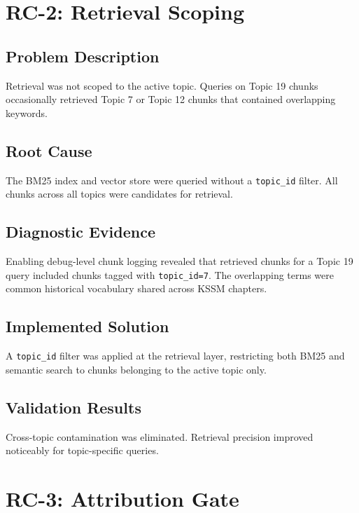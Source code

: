 \documentclass[12pt, a4paper]{report}
\newcommand{\codeinline}[1]{\texttt{#1}}
\begin{document}
\section{RC-2: Retrieval Scoping}
\label{sec:rc2}

\subsection{Problem Description}

Retrieval was not scoped to the active topic. Queries on Topic 19 chunks
occasionally retrieved Topic 7 or Topic 12 chunks that contained overlapping
keywords.

\subsection{Root Cause}

The BM25 index and vector store were queried without a \codeinline{topic\_id}
filter. All chunks across all topics were candidates for retrieval.

\subsection{Diagnostic Evidence}

Enabling debug-level chunk logging revealed that retrieved chunks for a Topic 19
query included chunks tagged with \codeinline{topic\_id=7}. The overlapping
terms were common historical vocabulary shared across KSSM chapters.

\subsection{Implemented Solution}

A \codeinline{topic\_id} filter was applied at the retrieval layer, restricting
both BM25 and semantic search to chunks belonging to the active topic only.

\subsection{Validation Results}

Cross-topic contamination was eliminated. Retrieval precision improved
noticeably for topic-specific queries.

\section{RC-3: Attribution Gate}
\label{sec:rc3}
\end{document}
